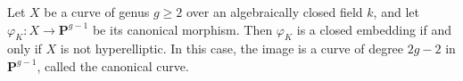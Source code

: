 Let $X$ be a curve of genus $g \geqslant 2$ over an algebraically closed field $k$, and let $\varphi_K: X \to \mathbf{P}^{g-1}$ be its canonical morphism. Then $\varphi_K$ is a closed embedding if and only if $X$ is not hyperelliptic. In this case, the image is a curve of degree $2g-2$ in $\mathbf{P}^{g-1}$, called the canonical curve.
